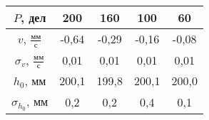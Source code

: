 \begin{tabular}[t]{|c|c|c|c|c|}
\hline
$P$, дел & 200 & 160 & 100 & 60 \\
\hline
$v$, $\frac{мм}{с}$ & -0,64 & -0,29 & -0,16 & -0,08 \\
\hline
$\sigma_v$, $\frac{мм}{с}$ & 0,01 & 0,01 & 0,01 & 0,01 \\
\hline
$h_0$, мм & 200,1 & 199,8 & 200,1 & 200,0 \\
\hline
$\sigma_{h_0}$, мм & 0,2 & 0,2 & 0,4 & 0,1 \\
\hline
\end{tabular}